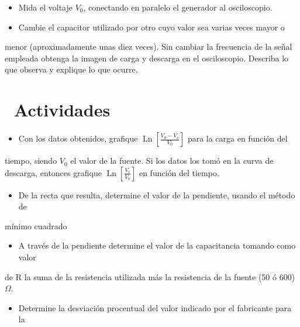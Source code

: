\documentclass[11pt,a4paper]{article}
\newcommand{\iconotexto}[2]{\textcolor{cyanNeon}{\faIcon{#1}}~#2}
\begin{document}
\begin{itemize}[leftmargin=1.4em,itemsep=2pt,topsep=3pt]
  \item Mida el voltaje $V_0$, conectando en paralelo el generador al osciloscopio.
  \item Cambie el capacitor utilizado por otro cuyo valor sea varias veces mayor o
\end{itemize}

menor (aproximadamente unas diez veces). Sin cambiar la frecuencia de la señal empleada obtenga la imagen de carga y descarga en el osciloscopio. Describa lo que observa y explique lo que ocurre.

\section{\iconotexto{calculator}{Actividades}}

\begin{itemize}[leftmargin=1.4em,itemsep=2pt,topsep=3pt]
  \item Con los datos obtenidos, grafique $\operatorname{Ln}\left[\frac{V_0-V_c}{V_0}\right]$ para la carga en función del
\end{itemize}

tiempo, siendo $V_0$ el valor de la fuente. Si los datos los tomó en la curva de descarga, entonces grafique $\operatorname{Ln}\left[\frac{V_c}{V_0}\right]$ en función del tiempo.

\begin{itemize}[leftmargin=1.4em,itemsep=2pt,topsep=3pt]
  \item De la recta que resulta, determine el valor de la pendiente, usando el método de
\end{itemize}

mínimo cuadrado

\begin{itemize}[leftmargin=1.4em,itemsep=2pt,topsep=3pt]
  \item A través de la pendiente determine el valor de la capacitancia tomando como valor
\end{itemize}

de R la suma de la resistencia utilizada más la resistencia de la fuente (50 ó 600)$\Omega$.

\begin{itemize}[leftmargin=1.4em,itemsep=2pt,topsep=3pt]
  \item Determine la desviación procentual del valor indicado por el fabricante para la
\end{itemize}
\end{document}
